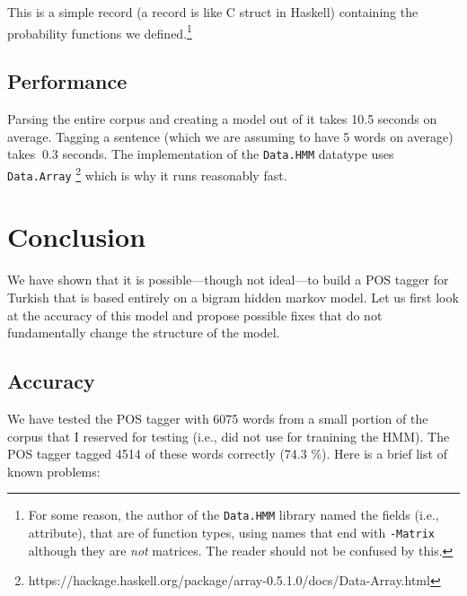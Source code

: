 \documentclass{article}
\begin{document}
This is a simple record (a record is like C struct in Haskell) containing the
probability functions we defined.\footnote{For some reason, the author of the
  \texttt{Data.HMM} library named the fields (i.e., attribute), that are of
  function types, using names that end with \texttt{-Matrix} although they are
  \emph{not} matrices. The reader should not be confused by this.}



\subsection{Performance}
Parsing the entire corpus and creating a model out of it takes 10.5 seconds on
average. Tagging a sentence (which we are assuming to have 5 words on average)
takes $~0.3$ seconds. The implementation of the \texttt{Data.HMM} datatype uses
\texttt{Data.Array}
\footnote{https://hackage.haskell.org/package/array-0.5.1.0/docs/Data-Array.html}
which is why it runs reasonably fast.

\section{Conclusion}

We have shown that it is possible---though not ideal---to build a POS tagger for
Turkish that is based entirely on a bigram hidden markov model. Let us first
look at the accuracy of this model and propose possible fixes that do not
fundamentally change the structure of the model.

\subsection{Accuracy}
\label{subsec:accuracy}

We have tested the POS tagger with 6075 words from a small portion of the corpus
that I reserved for testing (i.e., did not use for tranining the HMM). The POS
tagger tagged 4514 of these words correctly (74.3 \%). Here is a brief list of
known problems:
\end{document}
